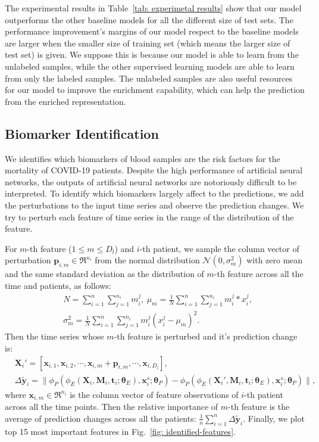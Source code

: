 The experimental results in Table~\ref{tab: experimetal results} show that our model outperforms the other baseline models for all the different size of test sets. The performance improvement's margins of our model respect to the baseline models are larger when the smaller size of training set (which means the larger size of test set) is given. We suppose this is because our model is able to learn from the unlabeled samples, while the other supervised learning models are able to learn from only the labeled samples. The unlabeled samples are also useful resources for our model to improve the enrichment capability, which can help the prediction from the enriched representation.
\subsection{Biomarker Identification}
We identifies which biomarkers of blood samples are the risk factors for the mortality of COVID-19 patients. Despite the high performance of artificial neural networks, the outputs of artificial neural networks are notoriously difficult to be interpreted. To identify which biomarkers largely affect to the predictions, we add the perturbations to the input time series and observe the prediction changes. We try to perturb each feature of time series in the range of the distribution of the feature.

For $m$-th feature ($1 \leq m \leq D_l$) and $i$-th patient, we sample the column vector of perturbation $\mathbf{p}_{i,m} \in \Re^{n_i}$ from the normal distribution $\mathcal{N}(0, \sigma_m^2)$ with zero mean and the same standard deviation as the distribution of $m$-th feature across all the time and patients, as follows:
\begin{equation}
\begin{aligned}
    &N = \sum_{i=1}^n \sum_{j=1}^{n_i} m^j_i,\ \mu_m = \frac{1}{N}\sum_{i=1}^n \sum_{j=1}^{n_i} m_i^j * x_i^j,\\
    &\sigma_m^2 = \frac{1}{N}\sum_{i=1}^n \sum_{j=1}^{n_i} m_i^j(x_i^j - \mu_m)^2.
\end{aligned}
\end{equation}
Then the time series whose $m$-th feature is perturbed and it's prediction change is:
\begin{equation}
\begin{aligned}
    &\mathbf{X}_i' = [\mathbf{x}_{i, 1}, \mathbf{x}_{i, 2}, \cdots, \mathbf{x}_{i, m} + \mathbf{p}_{i, m}, \cdots, \mathbf{x}_{i, D_l}],\\
    &\Delta\tilde{\mathbf{y}}_i = \| \phi_P(\phi_E(\mathbf{X}_i, \mathbf{M}_i, \mathbf{t}_i; \mathbf{\theta}_E), \mathbf{x}_i^s; \mathbf{\theta}_P) - \phi_P(\phi_E(\mathbf{X}_i', \mathbf{M}_i, \mathbf{t}_i; \mathbf{\theta}_E), \mathbf{x}_i^s; \mathbf{\theta}_P) \|,
\end{aligned}
\end{equation}
where $\mathbf{x}_{i, m} \in \Re^{n_i}$ is the column vector of feature observations of $i$-th patient across all the time points. Then the relative importance of $m$-th feature is the average of prediction changes across all the patients: $\frac{1}{n}\sum_{i=1}^n\Delta\tilde{\mathbf{y}}_i$. Finally, we plot top 15 most important features in Fig.~\ref{fig: identified-features}.

